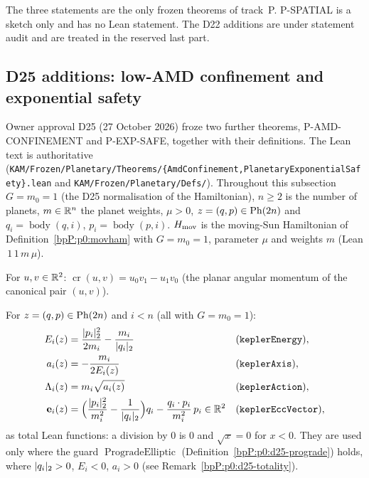 \begin{remark}\label{bpP:p0:scope}
The three statements are the only frozen theorems of track~P. P-SPATIAL is a sketch only and has no Lean statement. The D22 additions
are under statement audit and are treated in the reserved last part.
\end{remark}

\subsection{D25 additions: low-AMD confinement and exponential safety}\label{bpP:p0:d25-sec}

Owner approval D25 (27 October 2026) froze two further theorems, P-AMD-CONFINEMENT and P-EXP-SAFE, together with their
definitions. The Lean text is authoritative (\texttt{KAM/Frozen/Planetary/Theorems/\{AmdConfinement,PlanetaryExponentialSafety\}.lean} and
\texttt{KAM/Frozen/Planetary/Defs/}). Throughout this subsection $G=m_0=1$ (the D25 normalisation of the Hamiltonian),
$n\ge2$ is the number of planets, $m\in\mathbb{R}^n$ the planet weights, $\mu>0$, $z=(q,p)\in\mathrm{Ph}(2n)$ and $q_i=\operatorname{body}(q,i)$, $p_i=\operatorname{body}(p,i)$.
$H_{\rm mov}$ is the moving-Sun Hamiltonian of Definition~\ref{bpP:p0:movham} with $G=m_0=1$, parameter $\mu$ and weights $m$
(Lean \,$1\,1\,m\,\mu$).

\begin{definition}\label{bpP:p0:d25-cross}
For $u,v\in\mathbb{R}^2$: $\operatorname{cr}(u,v)=u_0v_1-u_1v_0$ (the planar angular momentum of the canonical pair $(u,v)$).
\end{definition}

\begin{definition}\label{bpP:p0:d25-kepler}
For $z=(q,p)\in\mathrm{Ph}(2n)$ and $i<n$ (all with $G=m_0=1$):
\begin{align*}
E_i(z)&=\frac{\lvert p_i\rvert_2^2}{2m_i}-\frac{m_i}{\lvert q_i\rvert_2}&&(\texttt{keplerEnergy}),\\
a_i(z)&=-\frac{m_i}{2E_i(z)}&&(\texttt{keplerAxis}),\\
\Lambda_i(z)&=m_i\sqrt{a_i(z)}&&(\texttt{keplerAction}),\\
\mathbf e_i(z)&=\Bigl(\frac{\lvert p_i\rvert_2^2}{m_i^2}-\frac1{\lvert q_i\rvert_2}\Bigr)q_i-\frac{q_i\cdot p_i}{m_i^2}\,p_i\in\mathbb{R}^2&&(\texttt{keplerEccVector}),
\end{align*}
as total Lean functions: a division by $0$ is $0$ and $\sqrt{x}=0$ for $x<0$. They are used only where the guard $\operatorname{ProgradeElliptic}$
(Definition~\ref{bpP:p0:d25-prograde}) holds, where $\lvert q_i\rvert_2>0$, $E_i<0$, $a_i>0$ (see Remark~\ref{bpP:p0:d25-totality}).
\end{definition}


